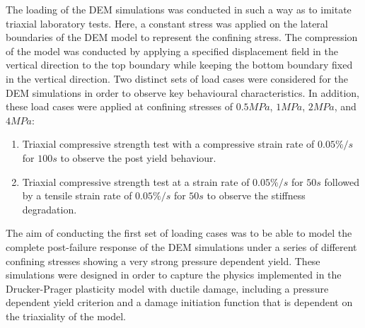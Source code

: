 The loading of the DEM simulations was conducted in such a way as to imitate triaxial laboratory tests. Here, a constant stress was applied on the lateral boundaries of the DEM model to represent the confining stress. The compression of the model was conducted by applying a specified displacement field in the vertical direction to the top boundary while keeping the bottom boundary fixed in the vertical direction. Two distinct sets of load cases were considered for the DEM simulations in order to observe key behavioural characteristics. In addition, these load cases were applied at confining stresses of $0.5MPa$, $1MPa$, $2MPa$, and $4MPa$:

\begin{enumerate}
\item Triaxial compressive strength test with a compressive strain rate of $0.05\%/s$ for $100s$ to observe the post yield behaviour.
\item Triaxial compressive strength test at a strain rate of $0.05\%/s$ for $50s$ followed by a tensile strain rate of $0.05\%/s$ for $50s$ to observe the stiffness degradation.
\end{enumerate}




The aim of conducting the first set of loading cases was to be able to model the complete post-failure response of the DEM simulations under a series of different confining stresses showing a very strong pressure dependent yield. These simulations were designed in order to capture the physics implemented in the Drucker-Prager plasticity model with ductile damage, including a pressure dependent yield criterion and a damage initiation function that is dependent on the triaxiality of the model. 

